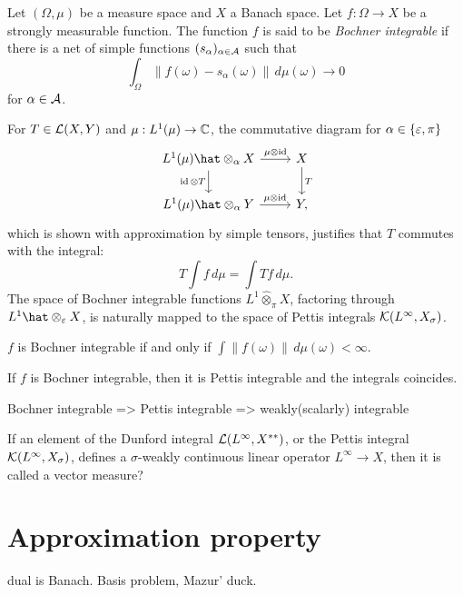 \documentclass{../../large}
\begin{document}
\begin{prb}
Let $(\Omega,\mu)$ be a measure space and $X$ a Banach space.
Let $f:\Omega\to X$ be a strongly measurable function.
The function $f$ is said to be \emph{Bochner integrable} if there is a net of simple functions $(s_\alpha)_{\alpha\in\mathcal{A}}$ such that
\[\int_\Omega\|f(\omega)-s_\alpha(\omega)\|\,d\mu(\omega)\to0\]
for $\alpha\in\mathcal{A}$.

For $T\in\mathcal{L}(X,Y)$ and $\mu:L^1(\mu)\to\mathbb{C}$, the commutative diagram for $\alpha\in\{\varepsilon,\pi\}$
\[\begin{tikzcd}
L^1(\mu)\hat\otimes_\alpha X \dar[swap]{\id\otimes T}\rar{\mu\otimes\id} & X \dar{T}\\
L^1(\mu)\hat\otimes_\alpha Y \rar{\mu\otimes\id} & Y,
\end{tikzcd}\]
which is shown with approximation by simple tensors, justifies that $T$ commutes with the integral:
\[T\int f\,d\mu=\int Tf\,d\mu.\]
The space of Bochner integrable functions $L^1\hat\otimes_\pi X$, factoring through $L^1\hat\otimes_\e X$, is naturally mapped to the space of Pettis integrals $\mathcal{K}(L^\infty,X_\sigma)$.
\begin{parts}
\item $f$ is Bochner integrable if and only if $\int\|f(\omega)\|\,d\mu(\omega)<\infty$.
\item If $f$ is Bochner integrable, then it is Pettis integrable and the integrals coincides.
\end{parts}
Bochner integrable => Pettis integrable => weakly(scalarly) integrable
\end{prb}


\begin{prb}
If an element of the Dunford integral $\mathcal{L}(L^\infty,X^{**})$, or the Pettis integral $\mathcal{K}(L^\infty,X_\sigma)$, defines a $\sigma$-weakly continuous linear operator $L^\infty\to X$, then it is called a vector measure?
\end{prb}


\section{Approximation property}
dual is Banach.
Basis problem, Mazur' duck.
\end{document}
